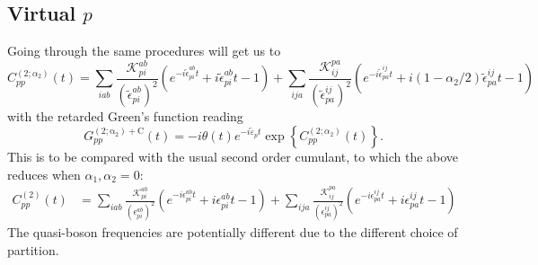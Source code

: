 \subsection{Virtual $p$}
Going through the same procedures will get us to 
\begin{equation}
    C_{pp}^{(2;\alpha_2)}(t) = 
    \sum_{i a b}\frac{\mathcal{K}_{pi}^{ab} }{\left(\tilde{\epsilon}_{p i}^{a b}\right)^2}\left(e^{-i \tilde{\epsilon}_{p i}^{a b} t} +i \tilde{\epsilon}_{p i}^{a b} t -1 \right) +\sum_{i j a} \frac{\mathcal{K}_{ij}^{pa}}{\left(\tilde{\epsilon}_{p a}^{i j}\right)^2} \left(e^{-i \tilde{\epsilon}_{p a}^{i j} t} +i \left( 1-\alpha_2 /2\right) \tilde{\epsilon}_{p a}^{i j} t -1 \right)
\end{equation}
with the retarded Green's function reading
\begin{equation}
    G_{pp}^{\mathrm{(2;\alpha_2)+C}}(t) = -i \theta(t) e^{-i\tilde{\varepsilon}_p t} \exp\left\{C_{pp}^{(2;\alpha_2)}(t)\right\}.
\end{equation}
This is to be compared with the usual second order cumulant, to which the above reduces when $\alpha_1, \alpha_2 = 0$:
\begin{align}
C_{pp}^{(2)}(t) & = \sum_{i a b}\frac{\mathcal{K}_{pi}^{ab} }{\left(\epsilon_{p i}^{a b}\right)^2}\left(e^{-i \epsilon_{p i}^{a b} t} +i \epsilon_{p i}^{a b} t -1 \right) +\sum_{i j a} \frac{\mathcal{K}_{ij}^{pa}}{\left(\epsilon_{p a}^{i j}\right)^2} \left(e^{-i \epsilon_{p a}^{i j} t} +i \epsilon_{p a}^{i j} t -1 \right)
\end{align}
The quasi-boson frequencies are potentially different due to the different choice of partition.
